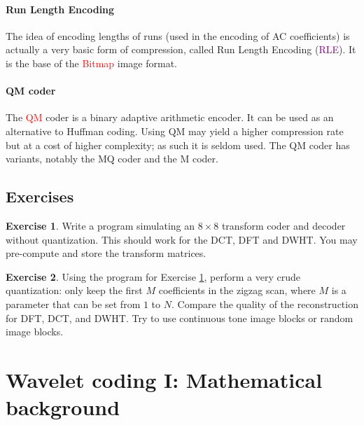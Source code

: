 \documentclass[a4paper, 11pt, openany]{book}
\numberwithin{equation}{section}
\theoremstyle{plain}
\theoremstyle{definition}
\newtheorem{exercise}   {Exercise}  [section]
\newcommand{\Important}[1]{\textcolor{red}{#1}}
\newcommand{\Define}[1]{\textcolor{purple}{#1}}
\begin{document}
\paragraph{Run Length Encoding} The idea of encoding lengths of runs (used in the encoding of AC coefficients) is actually a very basic form of compression, called Run Length Encoding (\Define{RLE}). It is the base of the \Important{Bitmap} image format.

\paragraph{QM coder} The \Important{QM} coder is a binary adaptive arithmetic encoder. It can be used as an alternative to Huffman coding. Using QM may yield a higher compression rate but at a cost of higher complexity; as such it is seldom used. The QM coder has variants, notably the MQ coder and the M coder.



\subsection{Exercises}

\begin{exercise} \label{exercise:transform_coder}
Write a program simulating an $8 \times 8$ transform coder and decoder without quantization. This should work for the DCT, DFT and DWHT. You may pre-compute and store the transform matrices.
\end{exercise}

\begin{exercise}
Using the program for Exercise \ref{exercise:transform_coder}, perform a very crude quantization: only keep the first $M$ coefficients in the zigzag scan,  where $M$ is a parameter that can be set from $1$ to $N$. Compare the quality of the reconstruction for DFT, DCT, and DWHT. Try to use continuous tone image blocks or random image blocks. 
\end{exercise}























\section{Wavelet coding I: Mathematical background}
\label{sec:08}
\end{document}
